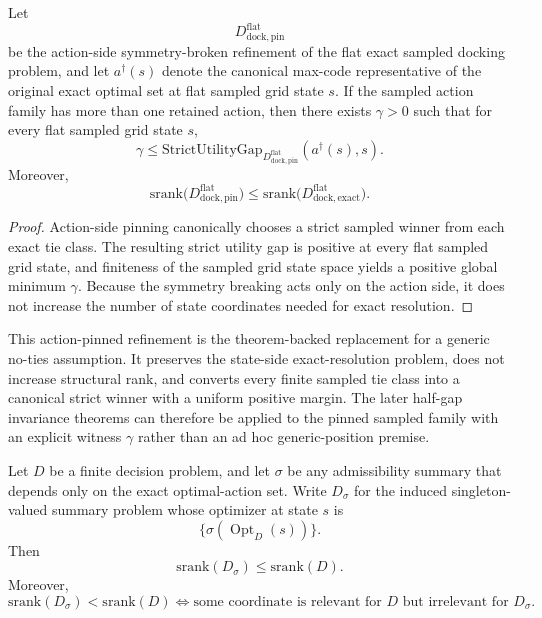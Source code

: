 \begin{theorem}\label{thm:action-pinned-uniform-gap}
Let
\[
  D^{\mathrm{flat}}_{\mathrm{dock,pin}}
\]
be the action-side symmetry-broken refinement of the flat exact sampled docking problem, and let $a^\dagger(s)$ denote the canonical max-code representative of the original exact optimal set at flat sampled grid state $s$. If the sampled action family has more than one retained action, then there exists $\gamma>0$ such that for every flat sampled grid state $s$,
\[
\gamma \le \mathrm{StrictUtilityGap}_{D^{\mathrm{flat}}_{\mathrm{dock,pin}}}(a^\dagger(s),s).
\]
Moreover,
\[
\mathrm{srank}\!\bigl(D^{\mathrm{flat}}_{\mathrm{dock,pin}}\bigr)
\le
\mathrm{srank}\!\bigl(D^{\mathrm{flat}}_{\mathrm{dock,exact}}\bigr).
\]
\end{theorem}

\begin{proof}
Action-side pinning canonically chooses a strict sampled winner from each exact tie class. The resulting strict utility gap is positive at every flat sampled grid state, and finiteness of the sampled grid state space yields a positive global minimum $\gamma$. Because the symmetry breaking acts only on the action side, it does not increase the number of state coordinates needed for exact resolution.
\end{proof}

This action-pinned refinement is the theorem-backed replacement for a generic no-ties assumption. It preserves the state-side exact-resolution problem, does not increase structural rank, and converts every finite sampled tie class into a canonical strict winner with a uniform positive margin. The later half-gap invariance theorems can therefore be applied to the pinned sampled family with an explicit witness $\gamma$ rather than an ad hoc generic-position premise.

\begin{theorem}\label{thm:admissibility-rank-reduction}
Let $D$ be a finite decision problem, and let $\sigma$ be any admissibility summary that depends only on the exact optimal-action set. Write $D_\sigma$ for the induced singleton-valued summary problem whose optimizer at state $s$ is
\[
\{\sigma(\operatorname{Opt}_D(s))\}.
\]
Then
\[
\mathrm{srank}(D_\sigma) \le \mathrm{srank}(D).
\]
Moreover,
\[
\mathrm{srank}(D_\sigma) < \mathrm{srank}(D)
\iff
\text{some coordinate is relevant for $D$ but irrelevant for $D_\sigma$.}
\]
\end{theorem}

